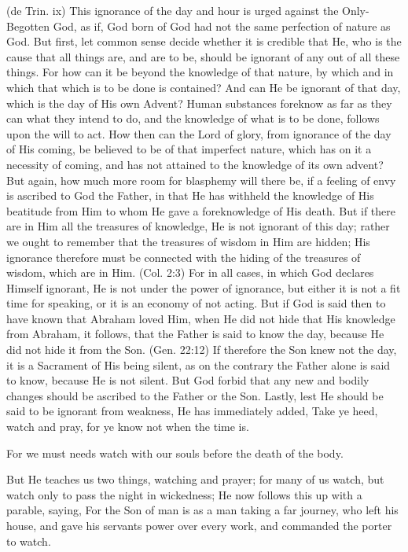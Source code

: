  (de Trin. ix) This ignorance of the day and hour is urged against the Only-Begotten God, as if, God born of God had not the same perfection of nature as God. But first, let common sense decide whether it is credible that He, who is the cause that all things are, and are to be, should be ignorant of any out of all these things. For how can it be beyond the knowledge of that nature, by which and in which that which is to be done is contained? And can He be ignorant of that day, which is the day of His own Advent? Human substances foreknow as far as they can what they intend to do, and the knowledge of what is to be done, follows upon the will to act. How then can the Lord of glory, from ignorance of the day of His coming, be believed to be of that imperfect nature, which has on it a necessity of coming, and has not attained to the knowledge of its own advent? But again, how much more room for blasphemy will there be, if a feeling of envy is ascribed to God the Father, in that He has withheld the knowledge of His beatitude from Him to whom He gave a foreknowledge of His death. But if there are in Him all the treasures of knowledge, He is not ignorant of this day; rather we ought to remember that the treasures of wisdom in Him are hidden; His ignorance therefore must be connected with the hiding of the treasures of wisdom, which are in Him. (Col. 2:3) For in all cases, in which God declares Himself ignorant, He is not under the power of ignorance, but either it is not a fit time for speaking, or it is an economy of not acting. But if God is said then to have known that Abraham loved Him, when He did not hide that His knowledge from Abraham, it follows, that the Father is said to know the day, because He did not hide it from the Son. (Gen. 22:12) If therefore the Son knew not the day, it is a Sacrament of His being silent, as on the contrary the Father alone is said to know, because He is not silent. But God forbid that any new and bodily changes should be ascribed to the Father or the Son. Lastly, lest He should be said to be ignorant from weakness, He has immediately added, Take ye heed, watch and pray, for ye know not when the time is.

 For we must needs watch with our souls before the death of the body.

 But He teaches us two things, watching and prayer; for many of us watch, but watch only to pass the night in wickedness; He now follows this up with a parable, saying, For the Son of man is as a man taking a far journey, who left his house, and gave his servants power over every work, and commanded the porter to watch.


